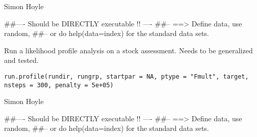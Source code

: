 \documentclass[a4paper]{book}
\begin{document}
%
\begin{Author}\relax

Simon Hoyle
\end{Author}
%
\begin{Examples}
\begin{ExampleCode}
##---- Should be DIRECTLY executable !! ----
##-- ==>  Define data, use random,
##--	or do  help(data=index)  for the standard data sets.

\end{ExampleCode}
\end{Examples}
%
\begin{Description}\relax

Run a likelihood profile analysis on a stock assessment. Needs to be generalized and tested. 
\end{Description}
%
\begin{Usage}
\begin{verbatim}
run.profile(rundir, rungrp, startpar = NA, ptype = "Fmult", target, nsteps = 300, penalty = 5e+05)
\end{verbatim}
\end{Usage}
%
\begin{Arguments}
\begin{ldescription}
\item[\code{rundir}] 


\item[\code{rungrp}] 


\item[\code{startpar}] 


\item[\code{ptype}] 


\item[\code{target}] 


\item[\code{nsteps}] 


\item[\code{penalty}] 


\end{ldescription}
\end{Arguments}
%
\begin{Author}\relax

Simon Hoyle
\end{Author}
%
\begin{Examples}
\begin{ExampleCode}
##---- Should be DIRECTLY executable !! ----
##-- ==>  Define data, use random,
##--	or do  help(data=index)  for the standard data sets.

\end{ExampleCode}
\end{Examples}
\end{document}

